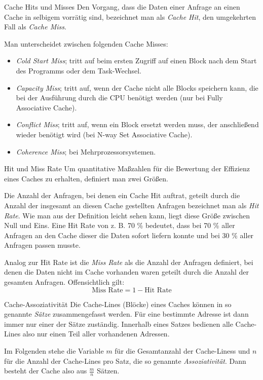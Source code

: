 \begin{defi}{Cache Hits und Misses}
    Den Vorgang, dass die Daten einer Anfrage an einen Cache in selbigem vorrätig sind, bezeichnet man als \emph{Cache Hit}, den umgekehrten Fall als \emph{Cache Miss}.

    Man unterscheidet zwischen folgenden Cache Misses:
    \begin{itemize}
        \item \emph{Cold Start Miss}; tritt auf beim ersten Zugriff auf einen Block nach dem Start des Programms oder dem Task-Wechsel.
        \item \emph{Capacity Miss}; tritt auf, wenn der Cache nicht alle Blocks speichern kann, die bei der Ausführung durch die CPU benötigt werden (nur bei Fully Associative Cache).
        \item \emph{Conflict Miss}; tritt auf, wenn ein Block ersetzt werden muss, der anschließend wieder benötigt wird (bei N-way Set Associative Cache).
        \item \emph{Coherence Miss}; bei Mehrprozessorsystemen.
    \end{itemize}
\end{defi}

\begin{defi}{Hit und Miss Rate}
    Um quantitative Maßzahlen für die Bewertung der Effizienz eines Caches zu erhalten, definiert man zwei Größen.

    Die Anzahl der Anfragen, bei denen ein Cache Hit auftrat, geteilt durch die Anzahl der insgesamt an diesen Cache gestellten Anfragen bezeichnet man als \emph{Hit Rate}.
    Wie man aus der Definition leicht sehen kann, liegt diese Größe zwischen Null und Eins. Eine Hit Rate von z. B. 70 \% bedeutet, dass bei 70 \% aller Anfragen an den Cache dieser die Daten sofort liefern konnte und bei 30 \% aller Anfragen passen musste.

    Analog zur Hit Rate ist die \emph{Miss Rate} als die Anzahl der Anfragen definiert, bei denen die Daten nicht im Cache vorhanden waren geteilt durch die Anzahl der gesamten Anfragen.
    Offensichtlich gilt:
    \[
        \text{Miss Rate} = 1 - \text{Hit Rate}
    \]
\end{defi}

\begin{defi}{Cache-Assoziativität}
    Die Cache-Lines (Blöcke) eines Caches können in so genannte \emph{Sätze} zusammengefasst werden.
    Für eine bestimmte Adresse ist dann immer nur einer der Sätze zuständig.
    Innerhalb eines Satzes bedienen alle Cache-Lines also nur einen Teil aller vorhandenen Adressen.

    Im Folgenden stehe die Variable $m$ für die Gesamtanzahl der Cache-Liness und $n$ für die Anzahl der Cache-Lines pro Satz, die so genannte \emph{Assoziativität}.
    Dann besteht der Cache also aus $\frac{m}{n}$ Sätzen.
\end{defi}

